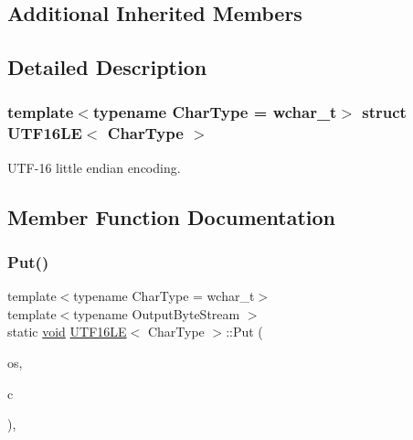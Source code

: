 \subsection*{Additional Inherited Members}


\subsection{Detailed Description}
\subsubsection*{template$<$typename Char\+Type = wchar\+\_\+t$>$\newline
struct U\+T\+F16\+L\+E$<$ Char\+Type $>$}

U\+T\+F-\/16 little endian encoding. 

\subsection{Member Function Documentation}
\mbox{\label{structUTF16LE_ac018cc43a1dba5a6ca232bd9a257072c}} 
\subsubsection{\texorpdfstring{Put()}{Put()}}
{\footnotesize\ttfamily template$<$typename Char\+Type  = wchar\+\_\+t$>$ \\
template$<$typename Output\+Byte\+Stream $>$ \\
static \hyperlink{imgui__impl__opengl3__loader_8h_ac668e7cffd9e2e9cfee428b9b2f34fa7}{void} \hyperlink{structUTF16LE}{U\+T\+F16\+LE}$<$ Char\+Type $>$\+::Put (\begin{DoxyParamCaption}\item[{Output\+Byte\+Stream \&}]{os,  }\item[{Char\+Type}]{c }\end{DoxyParamCaption})\hspace{0.3cm}{\ttfamily [inline]}, {\ttfamily [static]}}

\mbox{\label{structUTF16LE_a6bfd05f8cac35c1594c7fce47009f198}} 
